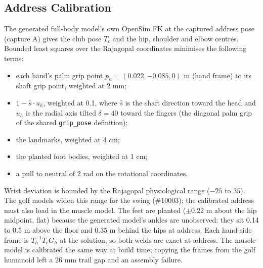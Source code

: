 \documentclass[11pt,a4paper]{article}
\begin{document}
\subsection{Address Calibration}
The generated full-body model's own OpenSim FK at the captured address pose
(capture A) gives the club pose $T_c$ and the hip, shoulder and elbow
centres. Bounded least squares over the Rajagopal coordinates minimises the
following terms:
\begin{itemize}
\item each hand's palm grip point $p_h=(0.022,-0.085,0)$ m (hand frame) to
  its shaft grip point, weighted at 2 mm;
\item $1-\hat s\cdot u_h$, weighted at 0.1, where $\hat s$ is the shaft
  direction toward the head and $u_h$ is the radial axis tilted
  $\delta=40$\textdegree{} toward the fingers (the diagonal palm grip of the
  shared \texttt{grip\_pose} definition);
\item the landmarks, weighted at 4 cm;
\item the planted foot bodies, weighted at 1 cm;
\item a pull to neutral of 2 rad on the rotational coordinates.
\end{itemize}
Wrist deviation is bounded by the Rajagopal physiological range
($-25$\textdegree{} to $35$\textdegree{}). The golf models widen this range
for the swing (\#10003); the calibrated address must also load in the muscle
model. The feet are planted ($\pm0.22$ m about the hip midpoint, flat)
because the generated model's ankles are unobserved: they sit 0.14 to 0.5 m
above the floor and 0.35 m behind the hips at address. Each hand-side frame
is $T_h^{-1}T_c G_h$ at the solution, so both welds are exact at address.
The muscle model is calibrated the same way at build time; copying the frames
from the golf humanoid left a 26 mm trail gap and an assembly failure.
\end{document}
